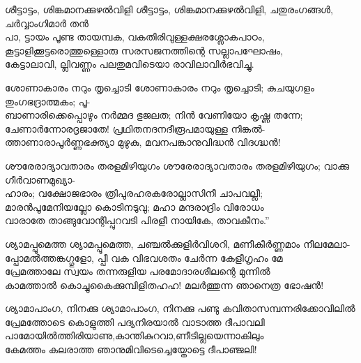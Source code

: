 \begin{enumerate}


\begin{slokam}{\VSr}{\VNM}{ശീട്ടാട്ടം, ശിങ്കമാനക്കുഴൽവിളി}
ശീട്ടാട്ടം, ശിങ്കമാനക്കുഴൽവിളി, ചതുരംഗങ്ങള്‍, ചർവ്വാംഗിമാർ തൻ\\
പാ, ട്ടായം പൂണ്ട തായമ്പക, വകതിരിവുള്ളക്ഷരശ്ലോകപാഠം,\\
കൂട്ടാളിക്കൂട്ടരൊത്തുള്ളൊരു സരസജനത്തിന്റെ സല്ലാപഘോഷം,\\
കേട്ടാലാവി, ല്ലിവണ്ണം പലതുമവിടെയാ രാവിലാവിർഭവിച്ചു.
\end{slokam}



\begin{slokam}{\VSr}{\VNM}{ശോണാകാരം നറും തൃച്ചൊടി}
 ശോണാകാരം നറും തൃച്ചൊടി; കുചയുഗളം തുംഗഭദ്രാത്മകം; പൂ-\\
ബാണാരിക്കെപ്പൊഴും നർമ്മദ ഭുജലത; നിൻ വേണിയോ കൃഷ്ണ തന്നേ;\\
ചേണാർന്നോരദൃജാതേ! പ്രഥിതനദനദീരൂപമായുള്ള നിങ്കൽ-\\
ത്താണാരാപൂർണ്ണഭക്ത്യാ മുഴുകു, മവനപങ്കാനുവിദ്ധൻ വിദഗ്ദ്ധൻ!
\end{slokam}



\begin{slokam}{\VSr}{\Unk}{ശൗരേരാദ്യാവതാരം തരളമിഴിയുഗം}
ശൗരേരാദ്യാവതാരം തരളമിഴിയുഗം; വാക്കു ഗീർവാണമുഖ്യാ-\\
ഹാരം; വക്ഷോജഭാരം ത്രിപുരഹരകരോല്ലാസിനീ ചാപവല്ലീ;\\
മാരൻപൂമേനിയല്ലോ കൊടിനടുവു; മഹാ മന്ദരാദ്രിം വിരോധം\\
വാരാതേ താങ്ങുവോന്റിപ്പുറവടി പിരളീ നായികേ, താവകീനം.”
\end{slokam}



\begin{slokam}{\VSr}{\VNM}{ശ്യാമപ്പൂമെത്ത}
ശ്യാമപ്പൂമെത്ത, ചഞ്ചൽക്കുളിർവിശറി, മണീകീർണ്ണമാം നീലമേലാ-\\
പ്പോമൽത്തങ്കഗ്ഗുളോ, പ്പീ വക വിഭവശതം ചേർന്ന കേളീഗൃഹം മേ\\
പ്രേമത്താലേ സ്വയം തന്നരുളിയ പരമോദാരശീലന്റെ മുന്നിൽ\\
കാമത്താൽ കൊച്ചുകൈക്കുമ്പിളിതഹഹ! മലർത്തുന്ന ഞാനെത്ര ഭോഷൻ!
\end{slokam}


\begin{slokam}{\VSv}{\RV}{ശ്യാമാപാംഗ, നിനക്കു}
ശ്യാമാപാംഗ, നിനക്കു പണ്ടു കവിതാസമ്പന്നരിക്കോവിലിൽ\\
പ്രേമത്തോടെ കൊളുത്തി പദ്യനിരയാൽ വാടാത്ത ദീപാവലി\\
പാമോയിൽത്തിരിയാണു,കാന്തികുറവാ,ണീടില്ലയെന്നാകിലും\\
കേമത്തം കലരാത്ത ഞാനുമിവിടെച്ചെയ്തോട്ടെ ദീപാഞ്ജലി!
\end{slokam}


\end{enumerate}
